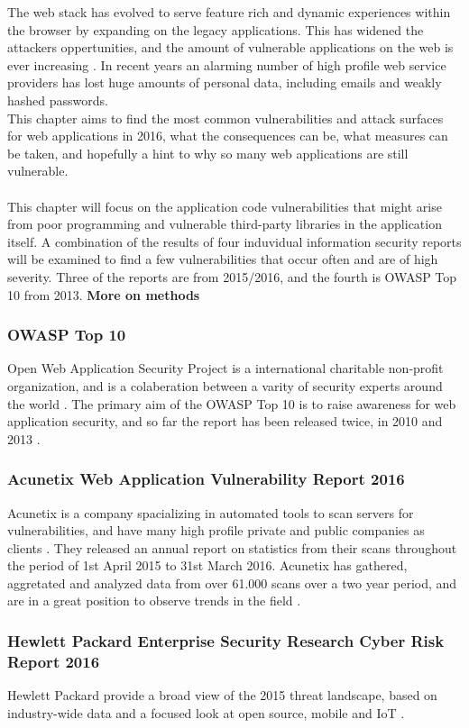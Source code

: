The web stack has evolved to serve feature rich and dynamic experiences within the browser by expanding on the legacy applications. This has widened the attackers oppertunities, and the amount of vulnerable applications on the web is ever increasing \cite{Acunetix2016}. In recent years an alarming number of high profile web service providers has lost huge amounts of personal data, including emails and weakly hashed passwords. \\ This chapter aims to find the most common vulnerabilities and attack surfaces for web applications in 2016, what the consequences can be, what measures can be taken, and hopefully a hint to why so many web applications are still vulnerable.
\\ \\
This chapter will focus on the application code vulnerabilities that might arise from poor programming and vulnerable third-party libraries in the application itself. A combination of the results of four induvidual information security reports will be examined to find a few vulnerabilities that occur often and are of high severity. Three of the reports are from 2015/2016, and the fourth is OWASP Top 10 from 2013. \textbf{More on methods}
\subsubsection{OWASP Top 10}
Open Web Application Security Project is a international charitable non-profit organization, and is a colaberation between a varity of security experts around the world \cite{OwaspCompany}. The primary aim of the OWASP Top 10 is to raise awareness for web application security, and so far the report has been released twice, in 2010 and 2013 \cite{OwaspTop10Project}.
\subsubsection{Acunetix Web Application Vulnerability Report 2016}
Acunetix is a company spacializing in automated tools to scan servers for vulnerabilities, and have many high profile private and public companies as clients \cite{AcunetixCompany}. They released an annual report on statistics from their scans throughout the period of 1st April 2015 to 31st March 2016. Acunetix has gathered, aggretated and analyzed data from over 61.000 scans over a two year period, and are in a great position to observe trends in the field \cite{Acunetix2016}. 
\subsubsection{Hewlett Packard Enterprise Security Research Cyber Risk Report 2016}
Hewlett Packard provide a broad view of the 2015 threat landscape, based on industry-wide data and a focused look at open source, mobile and IoT \cite{HP2016}.
